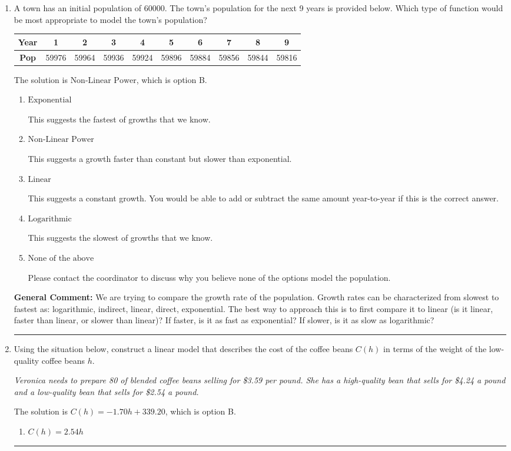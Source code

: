 \documentclass{extbook}[14pt]
\newcommand{\litem}[1]{\item #1

\rule{\textwidth}{0.4pt}}
\begin{document}
\begin{enumerate}\litem{
A town has an initial population of 60000. The town's population for the next 9 years is provided below. Which type of function would be most appropriate to model the town's population?


\begin{tabular}{c|c|c|c|c|c|c|c|c|c}
\textbf{Year} &1 &2 &3 &4 &5 &6 &7 &8 &9\tabularnewline \hline
\textbf{Pop} &59976 &59964 &59936 &59924 &59896 &59884 &59856 &59844 &59816\end{tabular}The solution is \( \text{Non-Linear Power} \), which is option B.\begin{enumerate}[label=\Alph*.]
\item \( \text{Exponential} \)

This suggests the fastest of growths that we know.
\item \( \text{Non-Linear Power} \)

This suggests a growth faster than constant but slower than exponential.
\item \( \text{Linear} \)

This suggests a constant growth. You would be able to add or subtract the same amount year-to-year if this is the correct answer.
\item \( \text{Logarithmic} \)

This suggests the slowest of growths that we know.
\item \( \text{None of the above} \)

Please contact the coordinator to discuss why you believe none of the options model the population.
\end{enumerate}

\textbf{General Comment:} We are trying to compare the growth rate of the population. Growth rates can be characterized from slowest to fastest as: logarithmic, indirect, linear, direct, exponential. The best way to approach this is to first compare it to linear (is it linear, faster than linear, or slower than linear)? If faster, is it as fast as exponential? If slower, is it as slow as logarithmic?
}
\litem{
Using the situation below, construct a linear model that describes the cost of the coffee beans $C(h)$ in terms of the weight of the low-quality coffee beans $h$.

\begin{center}
    \textit{ Veronica needs to prepare 80 of blended coffee beans selling for \$3.59 per pound. She has a high-quality bean that sells for \$4.24 a pound and a low-quality bean that sells for \$2.54 a pound. }
\end{center}
The solution is \( C(h) = -1.70 h + 339.20 \), which is option B.\begin{enumerate}[label=\Alph*.]
\item \( C(h) = 2.54 h \)


\end{enumerate}}
\end{enumerate}
\end{document}
